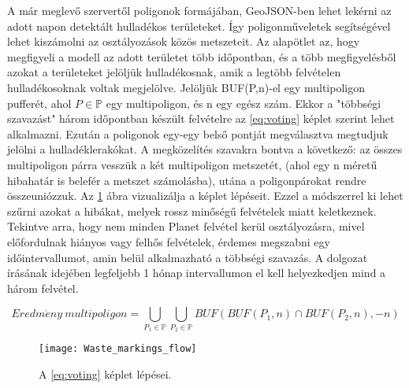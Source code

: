 A már meglevő szervertől poligonok formájában, GeoJSON-ben \cite{rfc7946} lehet lekérni az adott napon detektált hulladékos területeket. Így poligonműveletek segítségével lehet kiszámolni az osztályozások közös metszeteit. Az alapötlet az, hogy megfigyeli a modell az adott területet több időpontban, és a több megfigyelésből azokat a területeket jelöljük hulladékosnak, amik a legtöbb felvételen hulladékosoknak voltak megjelölve. Jelöljük BUF(P,n)-el egy multipoligon pufferét, ahol $P \in \mathbb{P}$ egy multipoligon, és n egy egész szám. Ekkor a "többségi szavazást" három időpontban készült felvételre az \ref{eq:voting} képlet szerint lehet alkalmazni. Ezután a poligonok egy-egy belső pontját megválasztva megtudjuk jelölni a hulladéklerakókat. A megközelítés szavakra bontva a következő: az összes multipoligon párra vesszük a két multipoligon metszetét, (ahol egy n méretű hibahatár is belefér a metszet számolásba), utána a poligonpárokat rendre összeuniózzuk. Az \ref{fig:union-intersection} ábra vizualizálja a képlet lépéseit. Ezzel a módszerrel ki lehet szűrni azokat a hibákat, melyek rossz minőségű felvételek miatt keletkeznek. Tekintve arra, hogy nem minden Planet felvétel kerül osztályozásra, mivel előfordulnak hiányos vagy felhős felvételek, érdemes megszabni egy időintervallumot, amin belül alkalmazható a többségi szavazás. A dolgozat írásának idejében legfeljebb 1 hónap intervallumon el kell helyezkedjen mind a három felvétel.

\begin{equation}\label{eq:voting}
    Eredm\acute{e}ny \ multipoligon = \bigcup_{P_1 \in \mathbb{P}} \bigcup_{P_2 \in \mathbb{P}} BUF(BUF(P_1,n) \cap BUF(P_2,n),-n)
\end{equation}

\begin{figure}[H]
	\centering
	\texttt{[image: Waste\_markings\_flow]}
	\caption{A \ref{eq:voting} képlet lépései.}
    \label{fig:union-intersection}
\end{figure}